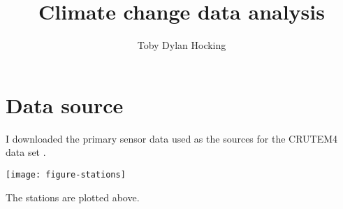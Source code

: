 \documentclass{article}
\begin{document}
\title{Climate change data analysis}

\author{Toby Dylan Hocking}

\maketitle

\section{Data source}

I downloaded the primary sensor data used as the sources for the
CRUTEM4 data set \citep{CRUTEM4}.

\begin{center}
  \texttt{[image: figure-stations]}
\end{center}

The stations are plotted above.




\end{document}
